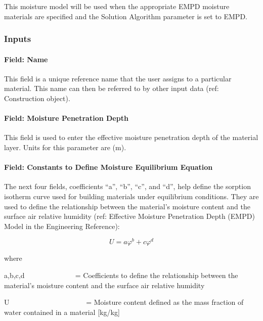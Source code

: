 This moisture model will be used when the appropriate EMPD moisture materials are specified and the Solution Algorithm parameter is set to EMPD.

\subsubsection{Inputs}\label{inputs-4-033}

\paragraph{Field: Name}\label{field-name-4-028}

This field is a unique reference name that the user assigns to a particular material. This name can then be referred to by other input data (ref: Construction object).

\paragraph{Field: Moisture Penetration Depth}\label{field-moisture-penetration-depth}

This field is used to enter the effective moisture penetration depth of the material layer. Units for this parameter are (m).

\paragraph{Field: Constants to Define Moisture Equilibrium Equation}\label{field-constants-to-define-moisture-equilibrium-equation}

The next four fields, coefficients ``a'', ``b'', ``c'', and ``d'', help define the sorption isotherm curve used for building materials under equilibrium conditions. They are used to define the relationship between the material's moisture content and the surface air relative humidity (ref: Effective Moisture Penetration Depth (EMPD) Model in the Engineering Reference):

\begin{equation}
U = a{\varphi ^b} + c{\varphi ^d}
\end{equation}

where

a,b,c,d~~~~~~~~~ ~~~~ = Coefficients to define the relationship between the material's moisture content and the surface air relative humidity

U~~~~~~~~~~~~~~~~~~~~~ = Moisture content defined as the mass fraction of water contained in a material {[}kg/kg{]}

